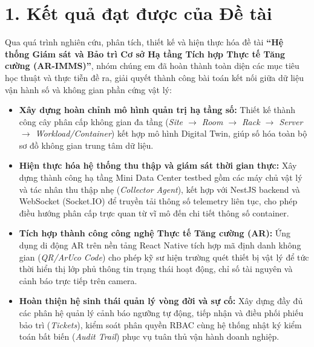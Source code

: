\section*{1. Kết quả đạt được của Đề tài}
Qua quá trình nghiên cứu, phân tích, thiết kế và hiện thực hóa đề tài \textbf{“Hệ thống Giám sát và Bảo trì Cơ sở Hạ tầng Tích hợp Thực tế Tăng cường (AR-IMMS)”}, nhóm chúng em đã hoàn thành toàn diện các mục tiêu học thuật và thực tiễn đề ra, giải quyết thành công bài toán kết nối giữa dữ liệu vận hành số và không gian phần cứng vật lý:
\begin{itemize}[leftmargin=2em]
    \item \textbf{Xây dựng hoàn chỉnh mô hình quản trị hạ tầng số:} Thiết kế thành công cây phân cấp không gian đa tầng (\textit{Site $\rightarrow$ Room $\rightarrow$ Rack $\rightarrow$ Server $\rightarrow$ Workload/Container}) kết hợp mô hình Digital Twin, giúp số hóa toàn bộ sơ đồ không gian trung tâm dữ liệu.
    \item \textbf{Hiện thực hóa hệ thống thu thập và giám sát thời gian thực:} Xây dựng thành công hạ tầng Mini Data Center testbed gồm các máy chủ vật lý và tác nhân thu thập nhẹ (\textit{Collector Agent}), kết hợp với NestJS backend và WebSocket (Socket.IO) để truyền tải thông số telemetry liên tục, cho phép điều hướng phân cấp trực quan từ vĩ mô đến chi tiết thông số container.
    \item \textbf{Tích hợp thành công công nghệ Thực tế Tăng cường (AR):} Ứng dụng di động AR trên nền tảng React Native tích hợp mã định danh không gian (\textit{QR/ArUco Code}) cho phép kỹ sư hiện trường quét thiết bị vật lý để tức thời hiển thị lớp phủ thông tin trạng thái hoạt động, chỉ số tài nguyên và cảnh báo trực tiếp trên camera.
    \item \textbf{Hoàn thiện hệ sinh thái quản lý vòng đời và sự cố:} Xây dựng đầy đủ các phân hệ quản lý cảnh báo ngưỡng tự động, tiếp nhận và điều phối phiếu bảo trì (\textit{Tickets}), kiểm soát phân quyền RBAC cùng hệ thống nhật ký kiểm toán bất biến (\textit{Audit Trail}) phục vụ tuân thủ vận hành doanh nghiệp.
\end{itemize}

